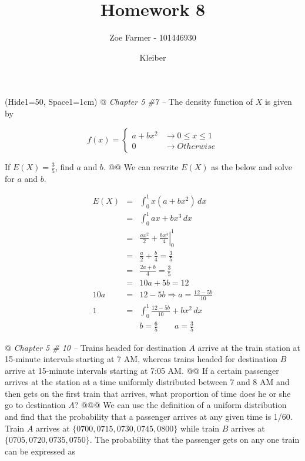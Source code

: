 \documentclass[10pt]{article}
\title{Homework 8}
\date{Kleiber}
\author{Zoe Farmer - 101446930}
\begin{document}
\maketitle

\begin{table}[!ht]
    \centering
\end{table}

\begin{easylist}[enumerate]
    \ListProperties(Hide1=50, Space1=1cm)
    @ \textit{Chapter 5 \#7 --} The density function of $X$ is given by

    \[
        f(x) =
        \begin{cases}
            a + b x^2 &\to 0 \le x \le 1\\
            0 &\to Otherwise
        \end{cases}
    \]

    If $E(X) = \frac{3}{5}$, find $a$ and $b$.
    @@ We can rewrite $E(X)$ as the below and solve for $a$ and $b$.

    \[
        \begin{aligned}
            E(X) &=& \int^1_0 x \left( a + b x^2 \right) \, dx\\
                 &=& \int^1_0 ax + b x^3  \, dx\\
                 &=& \left. \frac{ax^2}{2} + \frac{bx^4}{4} \right|^1_0\\
                 &=& \frac{a}{2} + \frac{b}{4} = \frac{3}{5}\\
                 &=& \frac{2a + b}{4} = \frac{3}{5}\\
                 &=& 10a + 5b = 12\\
             10a &=& 12 - 5b \Rightarrow a = \frac{12 - 5b}{10}\\
             1 &=& \int^1_0 \frac{12 - 5b}{10} + bx^2 \, dx\\
             && \boxed{b = \frac{6}{5} \qquad a = \frac{3}{5} }
        \end{aligned}
    \]

    @ \textit{Chapter 5 \# 10 --} Trains headed for destination $A$ arrive at the train station at 15-minute intervals
    starting at 7 AM, whereas trains headed for destination $B$ arrive at 15-minute intervals starting at 7:05 AM.
    @@ If a certain passenger arrives at the station at a time uniformly distributed between 7 and 8 AM and then gets on
    the first train that arrives, what proportion of time does he or she go to destination $A$?
    @@@ We can use the definition of a uniform distribution and find that the probability that a passenger arrives at
    any given time is 1/60. Train $A$ arrives at $\{0700, 0715, 0730, 0745, 0800\}$ while train $B$ arrives at
    $\{0705,0720,0735,0750\}$. The probability that the passenger gets on any one train can be expressed as


\end{easylist}
\end{document}
